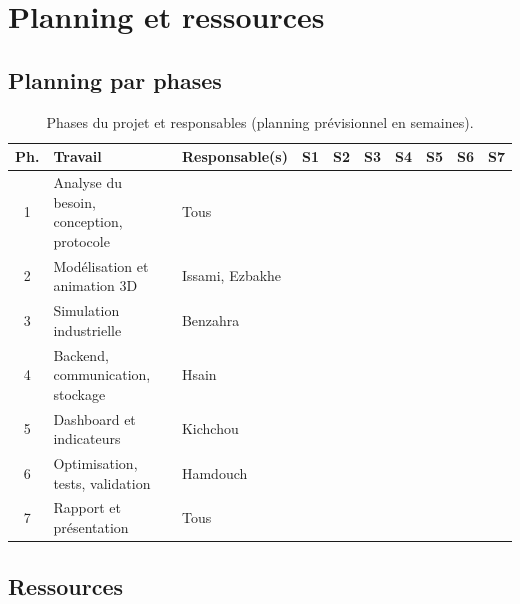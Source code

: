 \chapter{Planning et ressources}
\label{ann:planning}

\section{Planning par phases}

\begin{table}[H]
\centering
\caption{Phases du projet et responsables (planning prévisionnel en semaines).}
\label{tab:planning}
\small
\begin{tabularx}{\textwidth}{@{}c X l *{7}{c}@{}}
\toprule
\textbf{Ph.} & \textbf{Travail} & \textbf{Responsable(s)} & \textbf{S1} & \textbf{S2} & \textbf{S3} & \textbf{S4} & \textbf{S5} & \textbf{S6} & \textbf{S7} \\
\midrule
1 & Analyse du besoin, conception, protocole & Tous & \cellcolor{ensambleu} & & & & & & \\
2 & Modélisation et animation 3D & Issami, Ezbakhe & & \cellcolor{ensambleu} & \cellcolor{ensambleu} & & & & \\
3 & Simulation industrielle & Benzahra & & \cellcolor{ensambleu} & \cellcolor{ensambleu} & & & & \\
4 & Backend, communication, stockage & Hsain & & & \cellcolor{ensambleu} & \cellcolor{ensambleu} & & & \\
5 & Dashboard et indicateurs & Kichchou & & & & \cellcolor{ensambleu} & \cellcolor{ensambleu} & & \\
6 & Optimisation, tests, validation & Hamdouch & & & & & \cellcolor{ensambleu} & \cellcolor{ensambleu} & \\
7 & Rapport et présentation & Tous & & & & & & \cellcolor{ensambleu} & \cellcolor{ensambleu} \\
\bottomrule
\end{tabularx}
\end{table}

\section{Ressources}

